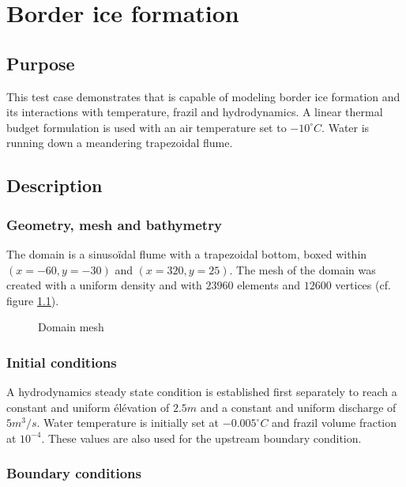 \renewcommand{\labelitemi}{$\triangleright$}

\chapter{Border ice formation}

\section{Purpose}
This test case demonstrates that \khione is capable of modeling border ice formation and its interactions with
temperature, frazil and hydrodynamics.
A linear thermal budget formulation is used with an air temperature set to $-10^{\circ} C$. Water is running down a meandering trapezoidal flume. 

\section{Description}

\subsection{Geometry, mesh and bathymetry}
The domain is a sinusoïdal flume with a trapezoidal bottom, boxed within $(x=-60, y=-30)$ and $(x=320, y=25)$.
The mesh of the domain was created with a uniform density and with $23960$ elements and $12600$ vertices (cf. figure \ref{fig:mesh}).

\begin{figure}[H]
    \begin{center}
    \end{center}
    \caption{Domain mesh}
    \label{fig:mesh}
\end{figure}

\subsection{Initial conditions}

A hydrodynamics steady state condition is established first separately to reach a constant and uniform élévation of $2.5m$ and a constant and uniform discharge of $5m^3/s$.
Water temperature is initially set at $-0.005^\circ C$ and frazil volume fraction at $10^{-4}$. These values are also used for the upstream boundary condition.

\subsection{Boundary conditions}

